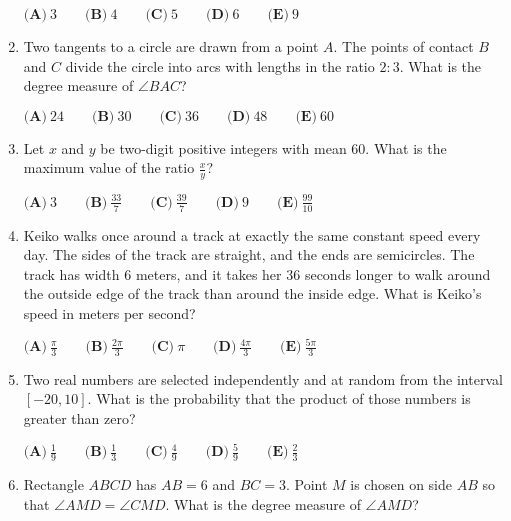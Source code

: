 \documentclass{article}
\begin{document}
\begin{enumerate}[label=\arabic*., itemsep=0.5em]
\(\textbf{(A)}\ 3 \qquad \textbf{(B)}\ 4 \qquad \textbf{(C)}\ 5 \qquad \textbf{(D)}\ 6 \qquad \textbf{(E)}\ 9\)\par \vspace{0.5em}\item Two tangents to a circle are drawn from a point \(A\).  The points of contact \(B\) and \(C\) divide the circle into arcs with lengths in the ratio \(2 : 3\).  What is the degree measure of \(\angle{BAC}\)?

\(\textbf{(A)}\ 24 \qquad \textbf{(B)}\ 30 \qquad \textbf{(C)}\ 36 \qquad \textbf{(D)}\ 48 \qquad \textbf{(E)}\ 60\)\par \vspace{0.5em}\item Let \(x\) and \(y\) be two-digit positive integers with mean \(60\).  What is the maximum value of the ratio \(\frac{x}{y}\)?

\(\textbf{(A)}\ 3 \qquad \textbf{(B)}\ \frac{33}{7} \qquad \textbf{(C)}\ \frac{39}{7} \qquad \textbf{(D)}\ 9 \qquad \textbf{(E)}\ \frac{99}{10}\)\par \vspace{0.5em}\item Keiko walks once around a track at exactly the same constant speed every day. The sides of the track are straight, and the ends are semicircles. The track has width \(6\) meters, and it takes her \(36\) seconds longer to walk around the outside edge of the track than around the inside edge. What is Keiko's speed in meters per second?

\(\textbf{(A)}\ \frac{\pi}{3} \qquad \textbf{(B)}\ \frac{2\pi}{3} \qquad \textbf{(C)}\ \pi \qquad \textbf{(D)}\ \frac{4\pi}{3} \qquad \textbf{(E)}\ \frac{5\pi}{3}\)\par \vspace{0.5em}\item Two real numbers are selected independently and at random from the interval \([-20,10]\).  What is the probability that the product of those numbers is greater than zero?

\(\textbf{(A)}\ \frac{1}{9} \qquad \textbf{(B)}\ \frac{1}{3} \qquad \textbf{(C)}\ \frac{4}{9} \qquad \textbf{(D)}\ \frac{5}{9} \qquad \textbf{(E)}\ \frac{2}{3}\)\par \vspace{0.5em}\item Rectangle \(ABCD\) has \(AB=6\) and \(BC=3\). Point \(M\) is chosen on side \(AB\) so that \(\angle AMD=\angle CMD\). What is the degree measure of \(\angle AMD\)?


\end{enumerate}
\end{document}

